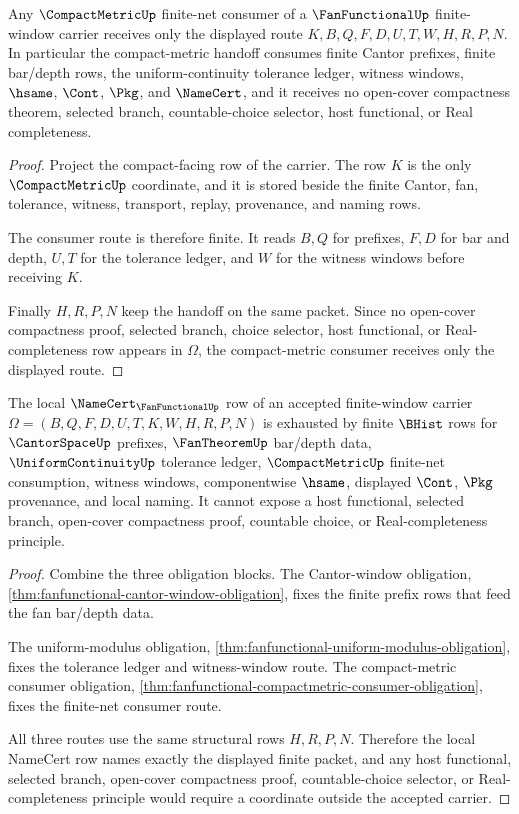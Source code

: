 \begin{theorem}
\label{thm:fanfunctional-compactmetric-consumer-obligation}
Any $\CompactMetricUp$ finite-net consumer of a $\FanFunctionalUp$ finite-window carrier receives only the displayed route $K,B,Q,F,D,U,T,W,H,R,P,N$. In particular the compact-metric handoff consumes finite Cantor prefixes, finite bar/depth rows, the uniform-continuity tolerance ledger, witness windows, $\hsame$, $\Cont$, $\Pkg$, and $\NameCert$, and it receives no open-cover compactness theorem, selected branch, countable-choice selector, host functional, or Real completeness.
\end{theorem}
\begin{proof}
Project the compact-facing row of the carrier. The row $K$ is the only $\CompactMetricUp$ coordinate, and it is stored beside the finite Cantor, fan, tolerance, witness, transport, replay, provenance, and naming rows.

The consumer route is therefore finite. It reads $B,Q$ for prefixes, $F,D$ for bar and depth, $U,T$ for the tolerance ledger, and $W$ for the witness windows before receiving $K$.

Finally $H,R,P,N$ keep the handoff on the same packet. Since no open-cover compactness proof, selected branch, choice selector, host functional, or Real-completeness row appears in $\Omega$, the compact-metric consumer receives only the displayed route.
\end{proof}

\begin{theorem}
\label{thm:fanfunctional-namecert-nonescape}
The local $\NameCert_{\FanFunctionalUp}$ row of an accepted finite-window carrier $\Omega=(B,Q,F,D,U,T,K,W,H,R,P,N)$ is exhausted by finite $\BHist$ rows for $\CantorSpaceUp$ prefixes, $\FanTheoremUp$ bar/depth data, $\UniformContinuityUp$ tolerance ledger, $\CompactMetricUp$ finite-net consumption, witness windows, componentwise $\hsame$, displayed $\Cont$, $\Pkg$ provenance, and local naming. It cannot expose a host functional, selected branch, open-cover compactness proof, countable choice, or Real-completeness principle.
\end{theorem}
\begin{proof}
Combine the three obligation blocks. The Cantor-window obligation, \autoref{thm:fanfunctional-cantor-window-obligation}, fixes the finite prefix rows that feed the fan bar/depth data.

The uniform-modulus obligation, \autoref{thm:fanfunctional-uniform-modulus-obligation}, fixes the tolerance ledger and witness-window route. The compact-metric consumer obligation, \autoref{thm:fanfunctional-compactmetric-consumer-obligation}, fixes the finite-net consumer route.

All three routes use the same structural rows $H,R,P,N$. Therefore the local NameCert row names exactly the displayed finite packet, and any host functional, selected branch, open-cover compactness proof, countable-choice selector, or Real-completeness principle would require a coordinate outside the accepted carrier.
\end{proof}

